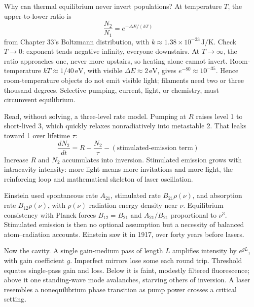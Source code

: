 \begin{mathbridge}
Why can thermal equilibrium never invert populations? At temperature \(T\), the upper-to-lower ratio is
\[
\frac{N_2}{N_1}=e^{-\Delta E/(kT)}
\]
from Chapter 33's Boltzmann distribution, with \(k\approx 1.38\times10^{-23}\,\mathrm{J/K}\). Check \(T\to 0\): exponent tends negative infinity, everyone downstairs. At \(T\to\infty\), the ratio approaches one, never more upstairs, so heating alone cannot invert. Room-temperature \(kT\approx 1/40\,\mathrm{eV}\), with visible \(\Delta E\approx 2\,\mathrm{eV}\), gives \(e^{-80}\approx 10^{-35}\). Hence room-temperature objects do not emit visible light; filaments need two or three thousand degrees. Selective pumping, current, light, or chemistry, must circumvent equilibrium.

Read, without solving, a three-level rate model. Pumping at \(R\) raises level 1 to short-lived 3, which quickly relaxes nonradiatively into metastable 2. That leaks toward 1 over lifetime \(\tau\):
\[
\frac{dN_2}{dt}=R-\frac{N_2}{\tau}-(\text{stimulated-emission term})
\]
Increase \(R\) and \(N_2\) accumulates into inversion. Stimulated emission grows with intracavity intensity: more light means more invitations and more light, the reinforcing loop and mathematical skeleton of laser oscillation.
\end{mathbridge}

\begin{challenge}
Einstein used spontaneous rate \(A_{21}\), stimulated rate \(B_{21}\rho(\nu)\), and absorption rate \(B_{12}\rho(\nu)\), with \(\rho(\nu)\) radiation energy density near \(\nu\). Equilibrium consistency with Planck forces \(B_{12}=B_{21}\) and \(A_{21}/B_{21}\) proportional to \(\nu^{3}\). Stimulated emission is then no optional assumption but a necessity of balanced atom--radiation accounts. Einstein saw it in 1917, over forty years before lasers.

Now the cavity. A single gain-medium pass of length \(L\) amplifies intensity by \(e^{gL}\), with gain coefficient \(g\). Imperfect mirrors lose some each round trip. Threshold equates single-pass gain and loss. Below it is faint, modestly filtered fluorescence; above it one standing-wave mode avalanches, starving others of inversion. A laser resembles a nonequilibrium phase transition as pump power crosses a critical setting.
\end{challenge}

